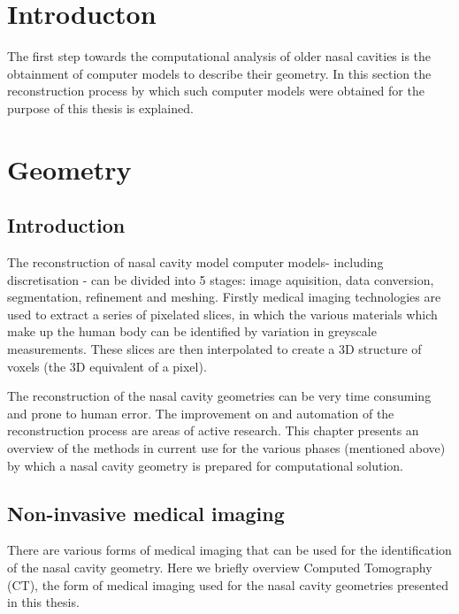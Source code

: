 \section{Introducton}

The first step towards the computational analysis of older nasal cavities is the obtainment of computer models to describe their geometry. In this section the reconstruction process by which such computer models were obtained for the purpose of this thesis is explained.

\section{Geometry}
\subsection{Introduction}

The reconstruction of nasal cavity model computer models- including discretisation - can be divided into 5 stages: image aquisition, data conversion, segmentation, refinement and meshing. Firstly medical imaging technologies are used to extract a series of pixelated slices, in which the various materials which make up the human body can be identified by variation in greyscale measurements. These slices are then interpolated to create a 3D structure of voxels (the 3D equivalent of a pixel).

The reconstruction of the nasal cavity geometries can be very time consuming and prone to human error. The improvement on and automation of the reconstruction process are areas of active research. This chapter presents an overview of the methods in current use for the various phases (mentioned above) by which a nasal cavity geometry is prepared for computational solution.

\subsection{Non-invasive medical imaging}

There are various forms of medical imaging that can be used for the identification of the nasal cavity geometry. Here we briefly overview Computed Tomography (CT), the form of medical imaging used for the nasal cavity geometries presented in this thesis.

